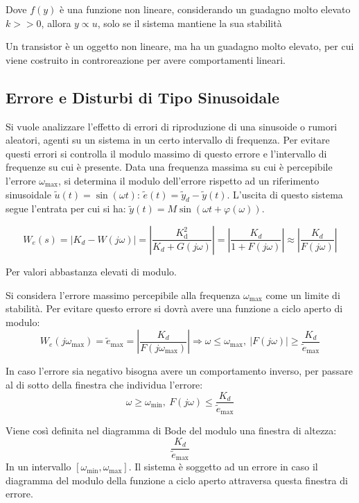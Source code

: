\documentclass{article}
\numberwithin{equation}{subsection}
\newcommand{\df}{\mathrm{d}}
\begin{document}
Dove $f(y)$ è una funzione non lineare, considerando un guadagno molto elevato $k>>0$, allora $y\propto u$, solo se il sistema mantiene la sua stabilità 

Un transistor è un oggetto non lineare, ma ha un guadagno molto elevato, per cui viene costruito in controreazione per avere comportamenti lineari. 

\subsection{Errore e Disturbi di Tipo Sinusoidale}

Si vuole analizzare l'effetto di errori di riproduzione di una sinusoide o rumori aleatori, agenti su un sistema in un certo intervallo di frequenza. Per evitare questi errori si controlla 
il modulo massimo di questo errore e l'intervallo di frequenze su cui è presente. Data una frequenza massima su cui è percepibile l'errore $\omega_{\max}$, si determina il modulo 
dell'errore rispetto ad un riferimento sinusoidale $\tilde{u}(t)=\sin({\omega}t)$: $\tilde{e}(t)=\tilde{y}_d-\tilde{y}(t)$. L'uscita di questo sistema segue l'entrata 
per cui si ha: $\tilde{y}(t)=M\sin({\omega}t+{\varphi}({\omega}))$. 

\begin{equation}
    W_e(s)=|K_d-W(j\omega)|=\left|\displaystyle\frac{K_\df^2}{K_d+G(j\omega)}\right|=\left|\frac{K_d}{1+F(j\omega)}\right|\approx\left|\frac{K_d}{F(j\omega)}\right|
\end{equation}

Per valori abbastanza elevati di modulo.


Si considera l'errore massimo percepibile alla frequenza $\omega_{\max}$ come un limite di stabilità. Per evitare questo errore si dovrà avere una funzione a ciclo aperto di 
modulo:
\begin{equation}
    W_e(j\omega_{\max})=\tilde{e}_{\max}=\displaystyle\left|\frac{K_d}{F(j\omega_{\max})}\right|\Rightarrow \omega\leq\omega_{\max},\:|F(j\omega)|\geq\frac{K_d}{\tilde{e}_{\max}}
\end{equation} 

In caso l'errore sia negativo bisogna avere un comportamento inverso, per passare al di sotto della finestra che individua l'errore:
\begin{equation}
    \omega\geq\omega_{\min},\:F(j\omega)\leq\displaystyle\frac{K_d}{\tilde{e}_{\max}}
\end{equation}

Viene così definita nel diagramma di Bode del modulo una finestra di altezza: 
\begin{equation*}
    \displaystyle\frac{K_d}{\tilde{e}_{\max}}
\end{equation*}
In un intervallo $[\omega_{\min},\omega_{\max}]$. 
Il sistema è soggetto ad un errore in caso il diagramma del modulo della funzione a ciclo aperto attraversa questa finestra di errore.  
\end{document}
